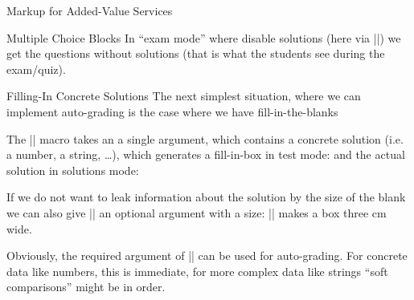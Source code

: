 \begin{sfragment}{Markup for Added-Value Services}
\begin{sfragment}{Multiple Choice Blocks}
In ``exam mode'' where disable solutions (here via |\stopsolutions|)
we get the questions without solutions (that is what the students see during the
exam/quiz).
\end{sfragment}

\begin{sfragment}{Filling-In Concrete Solutions}
The next simplest situation, where we can implement auto-grading is the case where we
have fill-in-the-blanks 

\begin{function}{\fillinsol}
  The |\fillinsol| macro takes an a single argument, which
  contains a concrete solution (i.e. a number, a string, \ldots), which generates a
  fill-in-box in test mode:
 and the actual solution in solutions mode:   
\end{function}
If we do not want to leak information about the solution by the size of the blank we can
also give |\fillinsol| an optional argument with a size: || makes a box
 three cm wide. 

 Obviously, the required argument of |\fillinsol| can be used for auto-grading. For
 concrete data like numbers, this is immediate, for more complex data like strings ``soft
 comparisons'' might be in order. 
\end{sfragment}
\end{sfragment}

